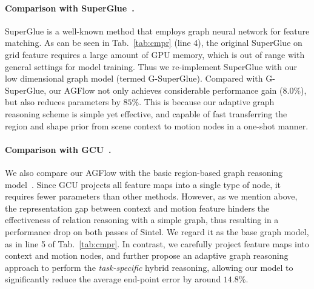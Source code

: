 \documentclass[letterpaper]{article} %
\begin{document}
\paragraph{Comparison with SuperGlue~\cite{Sarlin2020SuperGlueLF}.} SuperGlue is a well-known method that employs graph neural network for feature matching. As can be seen in Tab.~\ref{tab:cmpr} (line 4), the original SuperGlue on grid feature requires a large amount of GPU memory, which is out of range with general settings for model training. Thus we re-implement SuperGlue with our low dimensional graph model (termed G-SuperGlue). Compared with G-SuperGlue, our AGFlow not only achieves considerable performance gain ($8.0\%$), but also reduces parameters by $85\%$. This is because our adaptive graph reasoning scheme is simple yet effective, and capable of fast transferring the region and shape prior from scene context to motion nodes in a one-shot manner.

\paragraph{Comparison with GCU~\cite{Li2018BeyondGL}.}
We also compare our AGFlow with the basic region-based graph reasoning model~\cite{Li2018BeyondGL}. Since GCU projects all feature maps into a single type of node, it requires fewer parameters than other methods. However, as we mention above, the representation gap between context and motion feature hinders the effectiveness of relation reasoning with a simple graph, thus resulting in a performance drop on both passes of Sintel. We regard it as the base graph model, as in line 5 of Tab.~\ref{tab:cmpr}. In contrast, we carefully project feature maps into context and motion nodes, and further propose an adaptive graph reasoning approach to perform the {\em task-specific} hybrid reasoning, allowing our model to significantly reduce the average end-point error by around $14.8\%$.
\end{document}
